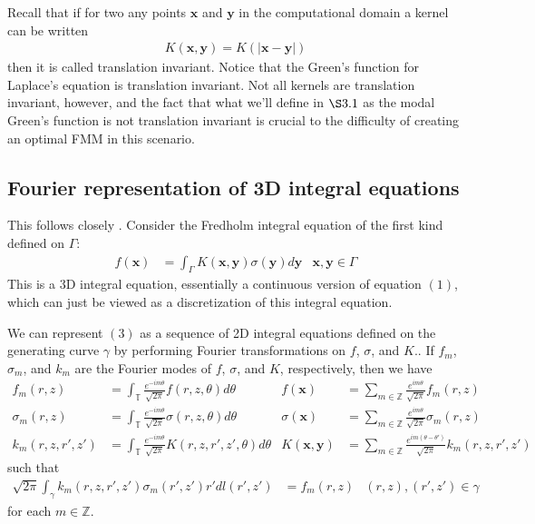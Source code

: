 \documentclass[11pt, oneside]{article}   	%
\begin{document}
Recall that if for two any points $\mathbf{x}$ and $\mathbf{y}$ in the computational domain a kernel can be written
\begin{align*}
K(\mathbf{x},\mathbf{y}) = K(|\mathbf{x}-\mathbf{y}|)
\end{align*}
then it is called translation invariant. Notice that the Green's function for Laplace's equation is translation invariant. Not all kernels are translation invariant, however, and the fact that what we'll define in $\S3.1$ as the modal Green's function is not translation invariant is crucial to the difficulty of creating an optimal FMM in this scenario.

\subsection{Fourier representation of 3D integral equations}
This follows closely \cite{YYM}.
Consider the Fredholm integral equation of the first kind defined on $\Gamma$:
\begin{align}
f(\mathbf{x}) &= \int_\Gamma K(\mathbf{x},\mathbf{y})\sigma(\mathbf{y})d\mathbf{y} &\mathbf{x},\mathbf{y}\in\Gamma
\end{align}
This is a 3D integral equation, essentially a continuous version of equation $(1)$, which can just be viewed as a discretization of this integral equation.

We can represent $(3)$ as a sequence of 2D integral equations defined on the generating curve $\gamma$ by performing Fourier transformations on $f$, $\sigma$, and $K$.. If $f_m$, $\sigma_m$, and $k_m$ are the Fourier modes of $f$, $\sigma$, and $K$, respectively, then we have
\begin{align*}
f_m(r,z)&=\int_\mathbb{T}\frac{e^{-im\theta}}{\sqrt{2\pi}}f(r,z,\theta)d\theta&f(\mathbf{x})&=\sum_{m\in\mathbb{Z}}\frac{e^{im\theta}}{\sqrt{2\pi}}f_m(r,z)\\
\sigma_m(r,z)&=\int_\mathbb{T}\frac{e^{-im\theta}}{\sqrt{2\pi}}\sigma(r,z,\theta)d\theta&\sigma(\mathbf{x})&=\sum_{m\in\mathbb{Z}}\frac{e^{im\theta}}{\sqrt{2\pi}}\sigma_m(r,z)\\
k_m(r,z,r',z')&=\int_\mathbb{T}\frac{e^{-im\theta}}{\sqrt{2\pi}}K(r,z,r',z',\theta)d\theta&K(\mathbf{x},\mathbf{y})&=\sum_{m\in\mathbb{Z}}\frac{e^{im(\theta-\theta')}}{\sqrt{2\pi}}k_m(r,z,r',z')
\end{align*}
such that
\begin{align}
\sqrt{2\pi}\int_\gamma k_m(r,z,r',z')\sigma_m(r',z')r'dl(r',z')&=f_m(r,z) &(r,z),(r',z')\in\gamma
\end{align}
for each $m\in\mathbb{Z}$.
\end{document}
